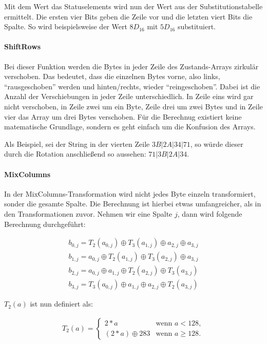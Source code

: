   Mit dem Wert das Statuselements wird nun der Wert aus der Substitutionstabelle ermittelt. Die ersten vier
   Bits geben die Zeile vor und die letzten viert Bits die Spalte. So wird beispielsweise der Wert $8D_{16}$ mit
   $5D_{16}$ substituiert.
   
  \paragraph{ShiftRows}
   Bei dieser Funktion werden die Bytes in jeder Zeile des Zustands-Arrays zirkulär verschoben. Das bedeutet,
   dass die einzelnen Bytes vorne, also links, ``rausgeschoben'' werden und hinten/rechts, wieder
   ``reingeschoben''. Dabei ist  die Anzahl der Verschiebungen in jeder Zeile unterschiedlich. In Zeile eins wird
   gar nicht verschoben, in Zeile zwei um ein Byte, Zeile drei um zwei Bytes und in Zeile vier das Array um drei
   Bytes verschoben. Für die Berechnug existiert keine matematische Grundlage, sondern es geht einfach
   um die Konfusion des Arrays.
   
   Als Beispiel, sei der String in der vierten Zeile $3B | 2A | 34 | 71$, so würde dieser durch die Rotation anschließend
   so aussehen: $71 | 3B | 2A | 34$.
   
  \paragraph{MixColumns}
   In der MixColumns-Transformation wird nicht jedes Byte einzeln transformiert, sonder die gesamte Spalte.
   Die Berechnung ist hierbei etwas umfangreicher, als in den Transformationen zuvor. Nehmen wir eine Spalte
   $j$, dann wird folgende Berechnung durchgeführt:
   
    \begin{equation*}
     \begin{split}
     b_{0,j} = T_2(a_{0,j}) \oplus T_3(a_{1,j}) \oplus a_{2,j} \oplus a_{3,j} \\
     b_{1,j} = a_{0,j} \oplus T_2(a_{1,j}) \oplus T_3(a_{2,j}) \oplus a_{3,j} \\
     b_{2,j} = a_{0,j} \oplus a_{1,j} \oplus T_2(a_{2,j}) \oplus T_3(a_{3,j}) \\
     b_{3,j} = T_3(a_{0,j}) \oplus a_{1,j} \oplus a_{2,j} \oplus T_2(a_{3,j})
     \end{split}
    \end{equation*}
    
    $T_2(a)$ ist nun definiert als:
    
    \begin{equation*}
     \begin{aligned}
     T_2(a) = \begin{cases}
      2 * a 		 & \text{wenn $a < 128$},\\
      (2*a) \oplus 283 & \text{wenn $a \geq 128$}.
     \end{cases}
     \end{aligned}
    \end{equation*}
    
